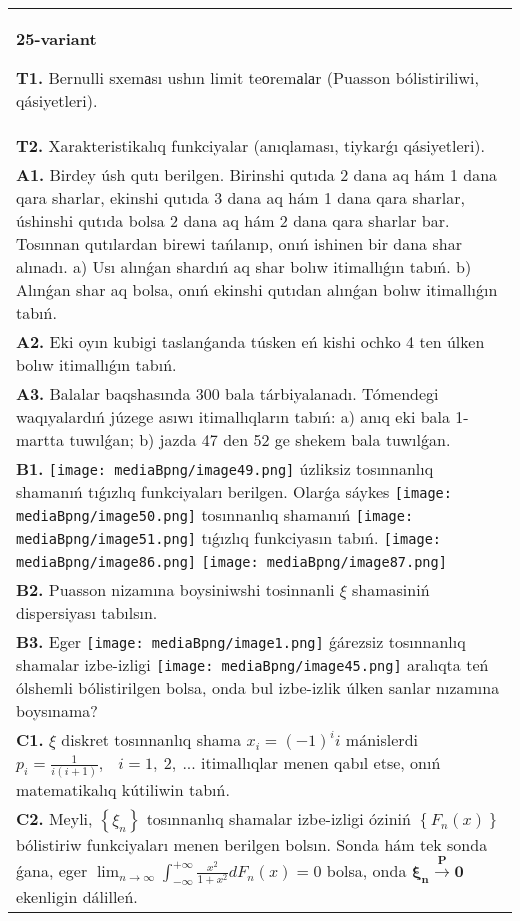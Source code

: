 \documentclass{article}
\begin{document}
\begin{tabular}{m{17cm}}
\textbf{25-variant}
\newline

\textbf{T1.} Bernulli sxemаsı ushın limit teоremаlаr (Puasson bólistiriliwi, qásiyetleri).
 \\
\textbf{T2.} Xarakteristikalıq funkciyalar (anıqlaması, tiykarǵı qásiyetleri).
 \\
\textbf{A1.} Birdey úsh qutı berilgen. Birinshi qutıda 2 dana aq hám 1 dana qara sharlar, ekinshi qutıda 3 dana aq hám 1 dana qara sharlar, úshinshi qutıda bolsa 2 dana aq hám 2 dana qara sharlar bar. Tosınnan qutılardan birewi tańlanıp, onıń ishinen bir dana shar alınadı. a) Usı alınǵan shardıń aq shar bolıw itimallıǵın tabıń. b) Alınǵan shar aq bolsa, onıń ekinshi qutıdan alınǵan bolıw itimallıǵın tabıń.
 \\
\textbf{A2.} Eki oyın kubigi taslanǵanda túsken eń kishi ochko 4 ten úlken bolıw itimallıǵın tabıń.
 \\
\textbf{A3.} Balalar baqshasında 300 bala tárbiyalanadı. Tómendegi waqıyalardıń júzege asıwı itimallıqların tabıń: a) anıq eki bala 1-martta tuwılǵan; b) jazda 47 den 52 ge shekem bala tuwılǵan.
 \\
\textbf{B1.} \texttt{[image: mediaBpng/image49.png]} úzliksiz tosınnanlıq shamanıń tıǵızlıq funkciyaları berilgen. Olarǵa sáykes \texttt{[image: mediaBpng/image50.png]} tosınnanlıq shamanıń \texttt{[image: mediaBpng/image51.png]} tıǵızlıq funkciyasın tabıń. \texttt{[image: mediaBpng/image86.png]} \texttt{[image: mediaBpng/image87.png]}
 \\
\textbf{B2.} Puasson nizamına boysiniwshi tosinnanli $\xi$ shamasiniń dispersiyası tabılsın.
 \\
\textbf{B3.} Eger \texttt{[image: mediaBpng/image1.png]} ǵárezsiz tosınnanlıq shamalar izbe-izligi \texttt{[image: mediaBpng/image45.png]} aralıqta teń ólshemli bólistirilgen bolsa, onda bul izbe-izlik úlken sanlar nızamına boysınama?
 \\
\textbf{C1.} 
\(\xi\) diskret tosınnanlıq shama \(x_{i} = ( - 1)^{i}i\) mánislerdi \(p_{i} = \frac{1}{i(i + 1)},\) \(\ \ i = 1,\ 2,\ ...\) itimallıqlar menen qabıl etse, onıń matematikalıq kútiliwin tabıń.
 \\
\textbf{C2.} Meyli, \(\left\{ \xi_{n} \right\}\) tosınnanlıq shamalar izbe-izligi óziniń \(\left\{ F_{n}(x) \right\}\) bólistiriw funkciyaları menen berilgen bolsın. Sonda hám tek sonda ǵana, eger \(\lim_{n \rightarrow \infty}\int_{- \infty}^{+ \infty}{\frac{x^{2}}{1 + x^{2}}dF_{n}(x)} = 0\) bolsa, onda \(\mathbf{\xi}_{\mathbf{n}}\overset{\mathbf{P}}{\rightarrow}\mathbf{0}\) ekenligin dálilleń.

\end{tabular}
\end{document}
